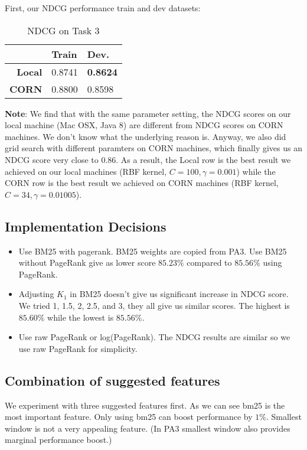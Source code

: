 \documentclass{article}
\begin{document}
First, our NDCG performance train and dev datasets:

\begin{table}[!htb]
    \centering
    \begin{tabular}{| r | l | l |}
        \hline
        & \textbf{Train} & \textbf {Dev.} \\
        \hline
        \textbf{Local} & 0.8741 & \textbf{0.8624} \\
        \hline
        \textbf{CORN} & 0.8800 & 0.8598 \\
        \hline
    \end{tabular}
    \caption{NDCG on Task 3}
\end{table}

\textbf{Note}: We find that with the same parameter setting, the NDCG scores on our local machine (Mac OSX, Java 8) are different from NDCG scores on CORN machines. We don't know what the underlying reason is. Anyway, we also did grid search with different paramters on CORN machines, which finally gives us an NDCG score very close to 0.86. As a result, the Local row is the best result we achieved on our local machines (RBF kernel, $C=100,\gamma=0.001$) while the CORN row is the best result we achieved on CORN machines (RBF kernel, $C=34,\gamma=0.01005$).

\subsection{Implementation Decisions}

\begin{itemize}
    \item Use BM25 with pagerank. BM25 weights are copied from PA3. Use BM25 without PageRank give as lower score $85.23\%$ compared to $85.56\%$ using PageRank.
    \item Adjusting $K_1$ in BM25 doesn't give us significant increase in NDCG score. We tried 1, 1.5, 2, 2.5, and 3, they all give us similar scores. The highest is $85.60\%$ while the lowest is $85.56\%$.
    \item Use raw PageRank or log(PageRank). The NDCG results are similar so we use raw PageRank for simplicity.
\end{itemize}

\subsection{Combination of suggested features}

We experiment with three suggested features first. As we can see bm25 is the most important feature. Only using bm25 can boost performance by $1\%$. Smallest window is not a very appealing feature. (In PA3 smallest window also provides marginal performance boost.)
\end{document}
